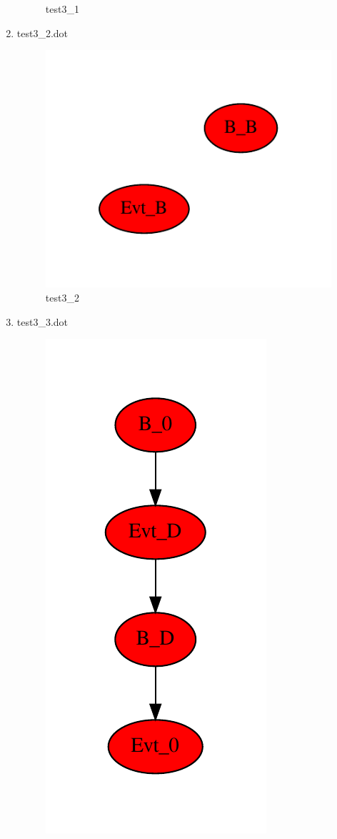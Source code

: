 \documentclass[12pt,a4paper]{report}
\begin{document}
\begin{enumerate}
\begin{figure}
        \caption{test3\_1}
        \label{fig:test3_1}
    \end{figure}
\item test3\_2.dot
    \begin{figure}
        \centering 
        \includegraphics*[width=1.0\textwidth,keepaspectratio]{TestPattern/test3_2.pdf}
        \caption{test3\_2}
        \label{fig:test3_2}
    \end{figure}
\item test3\_3.dot
    \begin{figure}
        \centering 
        \includegraphics{TestPattern/test3_3.pdf}

\end{figure}
\end{enumerate}
\end{document}
